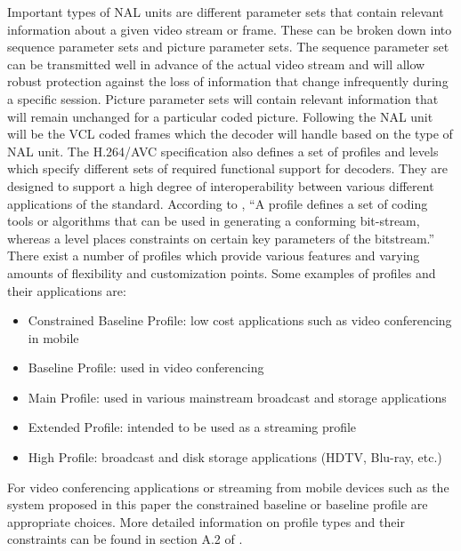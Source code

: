 \documentclass[a4paper,12pt]{article}
\begin{document}
Important types of NAL units are different parameter sets that contain relevant information about a given video stream or frame. These can be broken down into sequence parameter sets and picture parameter sets. The sequence parameter set can be transmitted well in advance of the actual video stream and will allow robust protection against the loss of information that change infrequently during a specific session. Picture parameter sets will contain relevant information that will remain unchanged for a particular coded picture. Following the NAL unit will be the VCL coded frames which the decoder will handle based on the type of NAL unit. The H.264/AVC specification also defines a set of profiles and levels which specify different sets of required functional support for decoders. They are designed to support a high degree of interoperability between various different applications of the standard. According to \cite{H264AVCOverview}, ``A profile defines a set of coding tools or algorithms that can be used in generating a conforming bit-stream, whereas a level places constraints on certain key parameters of the bitstream.'' There exist a number of profiles which provide various features and varying amounts of flexibility and customization points. Some examples of profiles and their applications are:
\begin{itemize}
\item Constrained Baseline Profile: low cost applications such as video conferencing in mobile
\item Baseline Profile: used in video conferencing
\item Main Profile: used in various mainstream broadcast and storage applications
\item  Extended Profile: intended to be used as a streaming profile
\item  High Profile: broadcast and disk storage applications (HDTV, Blu-ray, etc.)
\end{itemize}
For video conferencing applications or streaming from mobile devices such as the system proposed in this paper the constrained baseline or baseline profile are appropriate choices. More detailed information on profile types and their constraints can be found in section A.2 of \cite{H264Spec}.
\end{document}
